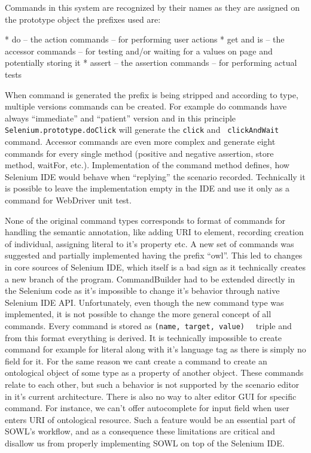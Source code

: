 Commands in this system are recognized by their names as they are assigned on
the prototype object the prefixes used are: 

\begitems
  * do -- the action commands -- for performing user actions
  * get and is -- the accessor commands -- for testing and/or waiting for a
    values on page and potentially storing it
  * assert -- the assertion commands -- for performing actual tests
\enditems

When command is generated the prefix is being stripped and according to type,
multiple versions commands can be created. For example do commands have always
``immediate'' and ``patient'' version and in this principle {\tt
Selenium.prototype.doClick} will generate the {\tt click} and {\tt
clickAndWait} command. Accessor commands are even more complex and generate
eight commands for every single method (positive and negative assertion, store
method, waitFor, etc.). Implementation of the command method defines, how
Selenium IDE would behave when ``replying'' the scenario recorded. Technically it
is possible to leave the implementation empty in the IDE and use it only as a
command for WebDriver unit test. 

None of the original command types corresponds to format of commands for
handling the semantic annotation, like adding URI to element, recording
creation of individual, assigning literal to it's property etc. A new set of
commands was suggested and partially implemented having the prefix ``owl''.
This led to changes in core sources of Selenium IDE, which itself is a bad sign
as it technically creates a new branch of the program. CommandBuilder had to be
extended directly in the Selenium code as it's impossible to change it's
behavior through native Selenium IDE API. Unfortunately, even though the new
command type was implemented, it is not possible to change the more general
concept of all commands. Every command is stored as {\tt (name, target, value)
}~ triple and from this format everything is
derived. It is technically impossible to create command for example for literal
along with it's language tag as there is simply no field for it. For the same
reason we cant create a command to create an ontological object of some type as
a property of another object.  These commands relate to each other, but such a
behavior is not supported by the scenario editor in it's current architecture.
There is also no way to alter editor GUI for specific command. For instance, we
can't offer autocomplete for input field when user enters URI of ontological
resource. Such a feature would be an essential part of SOWL's workflow, and as
a consequence these limitations are critical and disallow us from properly
implementing SOWL on top of the Selenium IDE. 


